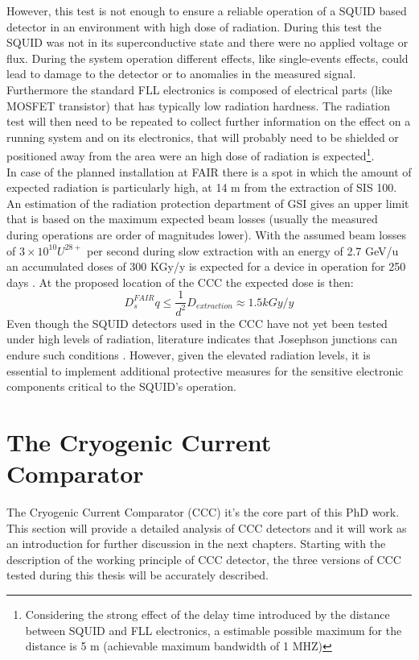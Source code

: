 \documentclass[12pt,a4paper]{report}
\begin{document}
   However, this test is not enough to ensure a reliable operation of a SQUID based detector in an environment with high dose of radiation. During this test the SQUID was not in its superconductive state and there were no applied voltage or flux. During the system operation different effects, like single-events effects, could lead to damage to the detector or to anomalies in the measured signal. Furthermore the standard FLL electronics is composed of electrical parts (like MOSFET transistor) that has typically low radiation hardness. The radiation test will then need to be repeated to collect further information on the effect on a running system and on its electronics, that will probably need to be shielded or positioned away from the area were an high dose of radiation is expected\footnote{Considering the strong effect of the delay time introduced by the distance between SQUID and FLL electronics, a estimable possible maximum for the distance is 5 m (achievable maximum bandwidth of 1 MHZ)}.\\
   In case of the planned installation at FAIR there is a spot in which the amount of expected radiation is particularly high, at 14 m from the extraction of SIS 100. An estimation of the radiation protection department of GSI gives an upper limit that is based on the maximum expected beam losses (usually the measured during operations are order of magnitudes lower). With the assumed beam losses of $3 \times 10^{10} U^{28+}$ per second during slow extraction with an energy of 2.7 GeV/u an accumulated doses of 300 KGy/y is expected for a device in operation for 250 days \cite{GSI_radiation}. At the proposed location of the CCC the expected dose is then:
   \begin{equation}
   	D^{FAIR}_sq \leq \frac{1}{d^2} D_{extraction} \approx 1.5 kGy/y
   \end{equation}
    Even though the SQUID detectors used in the CCC have not yet been tested under high levels of radiation, literature indicates that Josephson junctions can endure such conditions \cite{Irradiation_test_squid}. However, given the elevated radiation levels, it is essential to implement additional protective measures for the sensitive electronic components critical to the SQUID's operation.
    \chapter{The Cryogenic Current Comparator}
    The Cryogenic Current Comparator (CCC) it's the core part of this PhD work. This section will provide a detailed analysis of CCC detectors and it will work as an introduction for further discussion in the next chapters. Starting with the description of the working principle of CCC detector, the three versions of CCC tested during this thesis will be accurately described.
\end{document}
